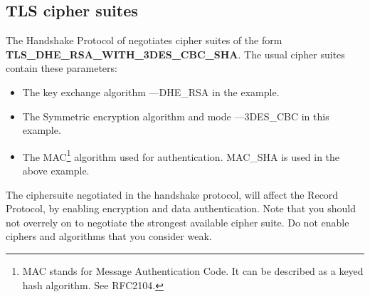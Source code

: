 \subsection{TLS cipher suites}
\par 
The Handshake Protocol of \tlsI{} negotiates cipher suites 
of the form \\
{\bf TLS\_DHE\_RSA\_WITH\_3DES\_CBC\_SHA}.
The usual cipher suites contain these parameters:
\begin{itemize}
\item The key exchange algorithm ---DHE\_RSA in the example.
\item The Symmetric encryption algorithm and mode ---3DES\_CBC in this
example.
\item The MAC\footnote{MAC stands for Message Authentication Code. It can
be described as a keyed hash algorithm. See RFC2104.} algorithm used for authentication.
MAC\_SHA is used in the above example.
\end{itemize}

The ciphersuite negotiated in the handshake protocol, will affect 
the Record Protocol, by enabling encryption and data authentication.
Note that you should not overrely on \tls{} to negotiate the strongest 
available cipher suite. Do not enable
ciphers and algorithms that you consider weak.

\addvspace{1.5cm}

